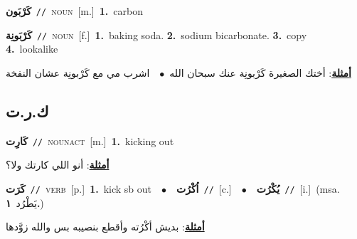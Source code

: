 \documentclass[10pt,a4paper,twoside]{article} %
\begin{document}
\begin{multicols}{2}
{\setlength\topsep{0pt}\textbf{\foreignlanguage{arabic}{كَرْبَون}}\ {\color{gray}\texttt{//}\color{black}}\ \textsc{noun}\ [m.]\ \textbf{1.}~carbon\ } \vspace{2mm}

{\setlength\topsep{0pt}\textbf{\foreignlanguage{arabic}{كَرْبَونِة}}\ {\color{gray}\texttt{//}\color{black}}\ \textsc{noun}\ [f.]\ \textbf{1.}~baking soda.  \textbf{2.}~sodium bicarbonate.  \textbf{3.}~copy  \textbf{4.}~lookalike\  \begin{flushright}\color{gray}\foreignlanguage{arabic}{\textbf{\underline{\foreignlanguage{arabic}{أمثلة}}}: أختك الصغيرة كَرْبونِة عنك سبحان الله\ $\bullet$\ \  اشرب مي مع كَرْبونِة عشان النفخة}\end{flushright}\color{black}} \vspace{2mm}

\vspace{-3mm}
\subsection*{\color{blue}\foreignlanguage{arabic}{ك.ر.ت}\color{blue}{}} 

{\setlength\topsep{0pt}\textbf{\foreignlanguage{arabic}{كَارِت}}\ {\color{gray}\texttt{//}\color{black}}\ \textsc{noun\textunderscore act}\ [m.]\ \textbf{1.}~kicking out\  \begin{flushright}\color{gray}\foreignlanguage{arabic}{\textbf{\underline{\foreignlanguage{arabic}{أمثلة}}}: أنو اللي كارتك ولا؟}\end{flushright}\color{black}} \vspace{2mm}

{\setlength\topsep{0pt}\textbf{\foreignlanguage{arabic}{كَرَت}}\ {\color{gray}\texttt{//}\color{black}}\ \textsc{verb}\ [p.]\ \textbf{1.}~kick sb out\ \ $\bullet$\ \ \setlength\topsep{0pt}\textbf{\foreignlanguage{arabic}{اُكْرُت}}\ {\color{gray}\texttt{//}\color{black}}\ [c.]\ \ $\bullet$\ \ \setlength\topsep{0pt}\textbf{\foreignlanguage{arabic}{يُكْرُت}}\ {\color{gray}\texttt{//}\color{black}}\ [i.]\ \color{gray}(msa. \foreignlanguage{arabic}{يَطْرُد}~\foreignlanguage{arabic}{\textbf{١.}})\color{black}\  \begin{flushright}\color{gray}\foreignlanguage{arabic}{\textbf{\underline{\foreignlanguage{arabic}{أمثلة}}}: بديش أكْرُته وأقطع بنصيبه بس والله زوَّدها}\end{flushright}\color{black}} \vspace{2mm}


\end{multicols}
\end{document}
